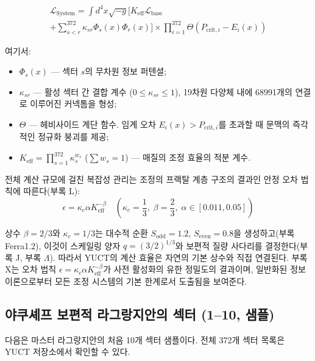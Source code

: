 \documentclass[11pt,a4paper]{article}
\begin{document}
	\begin{multline}
		\mathscr{L}_{\text{System}} = \int d^4x \sqrt{-g} \Bigg[ K_{\text{eff}} \mathscr{L}_{\text{base}} \\
		+ \sum_{s<r}^{372} \kappa_{sr} \Phi_s(x) \Phi_r(x) \Bigg] \times \prod_{i=1}^{372} \Theta(P_{\text{crit},i} - E_i(x))
	\end{multline}
	
	여기서:
	\begin{itemize}
		\item \(\Phi_s(x)\) — 섹터 \(s\)의 무차원 정보 퍼텐셜;
		\item \(\kappa_{sr}\) — 활성 섹터 간 결합 계수 (\(0 \le \kappa_{sr} \le 1\)), 19차원 다양체 내에 68991개의 연결로 이루어진 커넥톰을 형성;
		\item \(\Theta\) — 헤비사이드 계단 함수. 임계 오차 \(E_i(x) > P_{\text{crit},i}\)를 초과할 때 문맥의 즉각적인 정규화 붕괴를 제공;
		\item \(K_{\text{eff}} = \prod_{s=1}^{372} \kappa_s^{w_s}\) (\(\sum w_s = 1\)) — 매질의 조정 효율의 적분 계수.
	\end{itemize}
	
	전체 계산 규모에 걸친 복잡성 관리는 조정의 프랙탈 계층 구조의 결과인 안정 오차 법칙에 따른다(부록 L):
	\begin{equation}
		\epsilon = \kappa_c \alpha K_{\text{eff}}^{-\beta} \quad \left(\kappa_c = \frac{1}{3}, \; \beta = \frac{2}{3}, \; \alpha \in [0.011, 0.05]\right)
	\end{equation}
	
	상수 \(\beta = 2/3\)와 \(\kappa_c = 1/3\)는 대수적 순환 \(S_{\mathrm{odd}} = 1.2\), \(S_{\mathrm{even}} = 0.8\)을 생성하고(부록 Ferra1.2), 이것이 스케일링 양자 \(q = (3/2)^{1/3}\)와 보편적 질량 사다리를 결정한다(부록 J, 부록 \(\Lambda\)). 따라서 YUCT의 계산 효율은 자연의 기본 상수와 직접 연결된다. 부록 X는 오차 법칙 \(\epsilon = \kappa_c\alpha K_{\mathrm{eff}}^{-\beta}\)가 사전 활성화의 유한 정밀도의 결과이며, 일반화된 정보 이론으로부터 모든 조정 시스템의 기본 한계로서 도출됨을 보여준다.
	
	\subsection{야쿠셰프 보편적 라그랑지안의 섹터 (1–10, 샘플)}
	\label{sec:sectors}
	
	다음은 마스터 라그랑지안의 처음 10개 섹터 샘플이다. 전체 372개 섹터 목록은 YUCT 저장소에서 확인할 수 있다.
	
\end{document}
